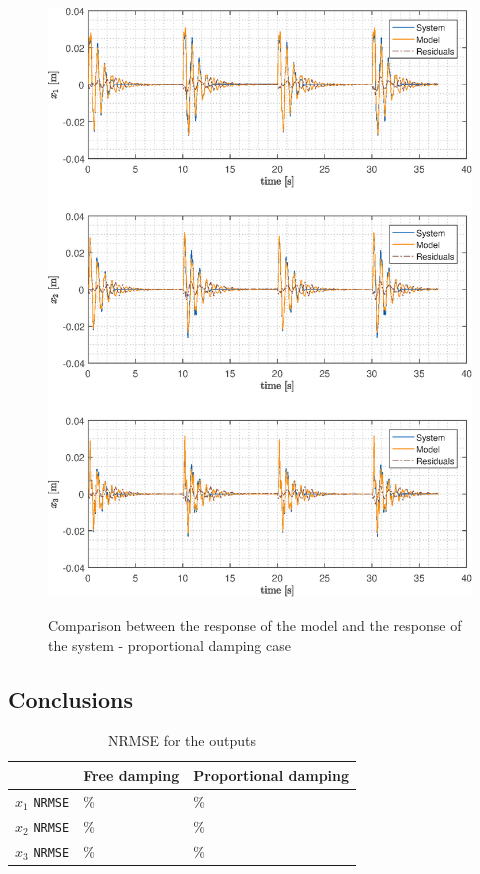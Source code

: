 \documentclass[twosided,a4paper]{article}           %
\begin{document}
\begin{figure}[H]
	\centering
	\caption{Comparison between the response of the model and the response of the system - proportional damping case}
	\includegraphics[width=\linewidth]{img/compare_p}
	\label{fig:compare_p}
\end{figure}

\subsection{Conclusions}

\begin{table}[]
	\centering
	\caption{NRMSE for the outputs}
	\label{tab:fit_all}
	\begin{tabular}{l|l|l|}
		\cline{2-3}
		& Free damping  & Proportional damping \\ \hline
		\multicolumn{1}{|l|}{$x_1$ \texttt{NRMSE} } &  \%        &          \%             \\ \hline
		\multicolumn{1}{|l|}{$x_2$ \texttt{NRMSE} } &   \%             &        \%           \\ \hline
		\multicolumn{1}{|l|}{$x_3$ \texttt{NRMSE} } &    \%  &
		 \%                              \\ \hline
	\end{tabular}
\end{table}
\end{document}
